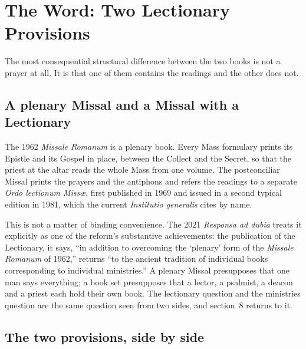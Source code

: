 \section{The Word: Two Lectionary Provisions}

The most consequential structural difference between the two books is not a prayer at all. It is that one of them contains the readings and the other does not.

\subsection{A plenary Missal and a Missal with a Lectionary}

The 1962 \emph{Missale Romanum} is a plenary book. Every Mass formulary prints its Epistle and its Gospel in place, between the Collect and the Secret, so that the priest at the altar reads the whole Mass from one volume. The postconciliar Missal prints the prayers and the antiphons and refers the readings to a separate \emph{Ordo lectionum Missæ}, first published in 1969 and issued in a second typical edition in 1981, which the current \emph{Institutio generalis} cites by name.

This is not a matter of binding convenience. The 2021 \emph{Responsa ad dubia} treats it explicitly as one of the reform's substantive achievements: the publication of the Lectionary, it says, ``in addition to overcoming the `plenary' form of the \emph{Missale Romanum} of 1962,'' returns ``to the ancient tradition of individual books corresponding to individual ministries.'' A plenary Missal presupposes that one man says everything; a book set presupposes that a lector, a psalmist, a deacon and a priest each hold their own book. The lectionary question and the ministries question are the same question seen from two sides, and section~8 returns to it.

\subsection{The two provisions, side by side}

